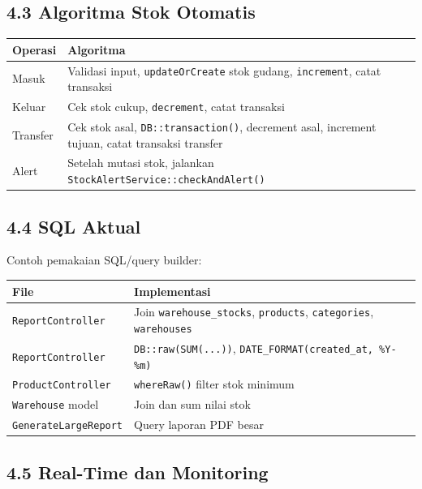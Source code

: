 \documentclass[
]{article}
\begin{document}
\subsection{4.3 Algoritma Stok
Otomatis}\label{43-algoritma-stok-otomatis}

\begin{longtable}[]{@{}P{0.26\textwidth}P{0.70\textwidth}@{}}
\toprule\noalign{}
Operasi & Algoritma \\
\midrule\noalign{}
\endhead
\bottomrule\noalign{}
\endlastfoot
Masuk & Validasi input, \texttt{updateOrCreate} stok gudang,
\texttt{increment}, catat transaksi \\
Keluar & Cek stok cukup, \texttt{decrement}, catat transaksi \\
Transfer & Cek stok asal, \texttt{DB::transaction()}, decrement asal,
increment tujuan, catat transaksi transfer \\
Alert & Setelah mutasi stok, jalankan
\texttt{StockAlertService::checkAndAlert()} \\
\end{longtable}

\subsection{4.4 SQL Aktual}\label{44-sql-aktual}

Contoh pemakaian SQL/query builder:

\begin{longtable}[]{@{}P{0.26\textwidth}P{0.70\textwidth}@{}}
\toprule\noalign{}
File & Implementasi \\
\midrule\noalign{}
\endhead
\bottomrule\noalign{}
\endlastfoot
\texttt{ReportController} & Join \texttt{warehouse\_stocks},
\texttt{products}, \texttt{categories}, \texttt{warehouses} \\
\texttt{ReportController} &
\texttt{DB::raw(\textquotesingle{}SUM(...)\textquotesingle{})},
\texttt{DATE\_FORMAT(created\_at,\ \textquotesingle{}\%Y-\%m\textquotesingle{})} \\
\texttt{ProductController} & \texttt{whereRaw()} filter stok minimum \\
\texttt{Warehouse} model & Join dan sum nilai stok \\
\texttt{GenerateLargeReport} & Query laporan PDF besar \\
\end{longtable}

\subsection{4.5 Real-Time dan
Monitoring}\label{45-real-time-dan-monitoring}
\end{document}
